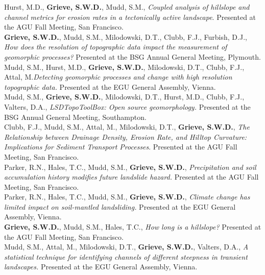\documentclass[10pt, a4paper]{article}
\newcommand{\years}[1]{\marginnote{\scriptsize #1}}
\begin{document}
\years{2016}Hurst, M.D., \textbf{Grieve, S.W.D.}, Mudd, S.M., \textit{Coupled analysis of hillslope and channel metrics for erosion rates in a tectonically active landscape}. Presented at the AGU Fall Meeting, San Francisco.\\[0.05cm]

\years{2016}\textbf{Grieve, S.W.D.}, Mudd, S.M., Milodowski, D.T., Clubb, F.J., Furbish, D.J., \textit{How does the resolution of topographic data impact the measurement of geomorphic processes?} Presented at the BSG Annual General Meeting, Plymouth.\\[0.05cm]

\years{2016}Mudd, S.M., Hurst, M.D., \textbf{Grieve, S.W.D.}, Milodowski, D.T., Clubb, F.J., Attal, M.\textit{Detecting geomorphic processes and change with high resolution topographic data.} Presented at the EGU General Assembly, Vienna.\\[0.05cm]

\years{2015}Mudd, S.M., \textbf{Grieve, S.W.D.}, Milodowski, D.T., Hurst, M.D., Clubb, F.J., Valters, D.A., \textit{LSDTopoToolBox: Open source geomorphology.} Presented at the BSG Annual General Meeting, Southampton.\\[0.05cm]

\years{2015}Clubb, F.J., Mudd, S.M., Attal, M., Milodowski, D.T., \textbf{Grieve, S.W.D.}, \textit{The Relationship between Drainage Density, Erosion Rate, and Hilltop Curvature: Implications for Sediment Transport Processes}. Presented at the AGU Fall Meeting, San Francisco.\\[0.05cm]

\years{2015}Parker, R.N., Hales, T.C., Mudd, S.M., \textbf{Grieve, S.W.D.}, \textit{Precipitation and soil accumulation history modifies future landslide hazard.} Presented at the AGU Fall Meeting, San Francisco.\\[0.05cm]

\years{2015}Parker, R.N., Hales, T.C., Mudd, S.M., \textbf{Grieve, S.W.D.}, \textit{Climate change has limited impact on soil-mantled landsliding.} Presented at the EGU General Assembly, Vienna.\\[0.05cm]

\years{2014}\textbf{Grieve, S.W.D.}, Mudd, S.M., Hales, T.C., \textit{How long is a hillslope?} Presented at the AGU Fall Meeting, San Francisco.\\[0.05cm]

\years{2014}Mudd, S.M., Attal, M., Milodowski, D.T., \textbf{Grieve, S.W.D.}, Valters, D.A., \textit{A statistical technique for identifying channels of different steepness in transient landscapes.} Presented at the EGU General Assembly, Vienna.\\[0.05cm]
\end{document}
